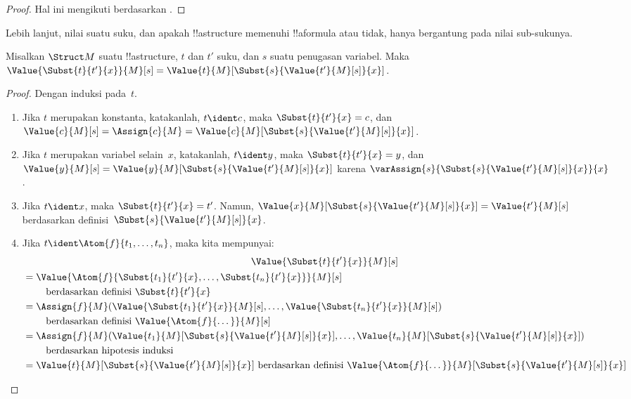 \documentclass[../../../include/open-logic-section]{subfiles}
\begin{document}
\begin{proof}
Hal ini mengikuti  berdasarkan
.
\end{proof}

Lebih lanjut, nilai suatu suku, dan apakah !!a{structure} memenuhi
!!a{formula} atau tidak, hanya bergantung pada nilai sub-sukunya.

\begin{prop}
Misalkan $\Struct M$ suatu !!a{structure}, $t$ dan $t'$ suku, dan $s$ suatu
penugasan variabel. Maka $\Value{\Subst{t}{t'}{x}}{M}[s] =
\Value{t}{M}[\Subst{s}{\Value{t'}{M}[s]}{x}]$.
\end{prop}

\begin{proof}
Dengan induksi pada~$t$.
\begin{enumerate}
\item Jika $t$ merupakan konstanta, katakanlah, $t\ident c$, maka
  $\Subst{t}{t'}{x} = c$, dan $\Value{c}{M}[s] = \Assign{c}{M} =
  \Value{c}{M}[\Subst{s}{\Value{t'}{M}[s]}{x}]$.

\item Jika $t$ merupakan variabel selain~$x$, katakanlah, $t \ident y$, maka
  $\Subst{t}{t'}{x} = y$, dan $\Value{y}{M}[s] =
  \Value{y}{M}[\Subst{s}{\Value{t'}{M}[s]}{x}]$ karena
  $\varAssign{s}{\Subst{s}{\Value{t'}{M}[s]}{x}}{x}$.

\item Jika $t \ident x$, maka $\Subst{t}{t'}{x} = t'$. Namun,
  $\Value{x}{M}[\Subst{s}{\Value{t'}{M}[s]}{x}] = \Value{t'}{M}[s]$
  berdasarkan definisi~$\Subst{s}{\Value{t'}{M}[s]}{x}$.

\item Jika $t \ident \Atom{f}{t_1,\dots,t_n}$, maka kita mempunyai:
\begin{multline*}
  \Value{\Subst{t}{t'}{x}}{M}[s]  \\
  \begin{aligned}[b]
& = \Value{\Atom{f}{\Subst{t_1}{t'}{x}, \dots, \Subst{t_n}{t'}{x}}}{M}[s]\\
& \qquad    \text{ berdasarkan definisi $\Subst{t}{t'}{x}$}\\
& = \Assign{f}{M}(\Value{\Subst{t_1}{t'}{x}}{M}[s], \dots,
    \Value{\Subst{t_n}{t'}{x}}{M}[s])\\
    & \qquad  \text{ berdasarkan definisi $\Value{\Atom{f}{\dots}}{M}[s]$}\\
& = \Assign{f}{M}(\Value{t_1}{M}[\Subst{s}{\Value{t'}{M}[s]}{x}], \dots,
   \Value{t_n}{M}[\Subst{s}{\Value{t'}{M}[s]}{x}])\\
& \qquad    \text{ berdasarkan hipotesis induksi}\\
& = \Value{t}{M}[\Subst{s}{\Value{t'}{M}[s]}{x}]
    \text{ berdasarkan definisi $\Value{\Atom{f}{\dots}}{M}[\Subst{s}{\Value{t'}{M}[s]}{x}]$}
  \end{aligned}
\end{multline*}
\end{enumerate}
\end{proof}
\end{document}
